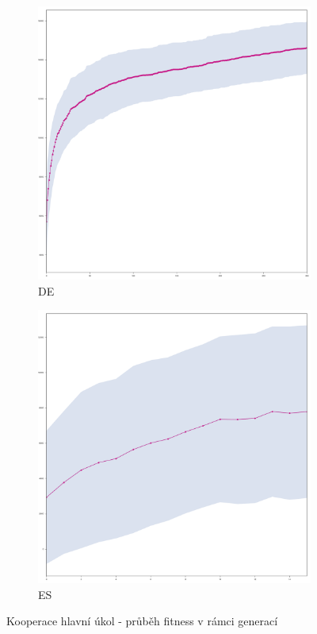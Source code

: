 	\begin{figure}[p]
		\centering
		\begin{subfigure}{.5\textwidth}
			\centering
			\includegraphics[width=\linewidth]{../img/WoodMap/DE/graph_of_WoodCoopMem-mean.png}
			\caption{DE}
			\label{obr04:CoopDE}
		\end{subfigure}%
		\begin{subfigure}{.5\textwidth}
			\centering
			\includegraphics[width=\linewidth]{../img/WoodMap/ES/WoodCoopES-mean.png}
			\caption{ES}
			\label{obr04:CoopES}
		\end{subfigure}
		\caption{Kooperace  hlavní úkol  - průběh fitness v rámci generací}
		\label{obr04:Coop}
	\end{figure}
	\clearpage
	
